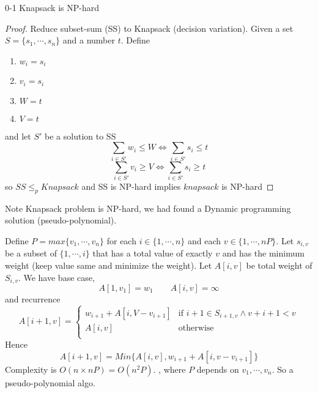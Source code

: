 \documentclass[11pt]{article}
\begin{document}
\begin{theorem*}
    0-1 Knapsack is NP-hard
    \begin{proof}
        Reduce subset-sum (SS) to Knapsack (decision variation). Given a set $S = \{s_1,\cdots, s_n \}$ and a number $t$. Define 
        \begin{enumerate}
            \item $w_i = s_i$
            \item $v_i = s_i$
            \item $W = t$
            \item $V = t$
        \end{enumerate}
        and let $S'$ be a solution to SS
        \[
            \sum_{i\in S'} w_i \leq W \iff \sum_{i\in S'} s_i \leq t
        \]
        \[
            \sum_{i\in S'} v_i \geq V \iff \sum_{i\in S'} s_i \geq t
        \]
        so $SS \leq_p Knapsack$ and SS is NP-hard implies $knapsack$ is NP-hard
    \end{proof}    
\end{theorem*}


\begin{defn*}
    Note Knapsack problem is NP-hard, we had found a Dynamic programming solution (pseudo-polynomial). \begin{solution}
        Define $P = max \{v_1,\cdots, v_n\}$ for each $i\in \{ 1,\cdots, n\}$ and each $v\in \{1,\cdots, nP \}$. Let $s_{i,v}$ be a subset of $\{ 1,\cdots, i\}$ that has a total value of exactly $v$ and has the minimum weight (keep value same and minimize the weight). Let $A[i, v] $ be total weight of $S_{i,v}$. We have base case, 
        \[
            A[1, v_1] = w_1 \quad \quad A[i,v] = \infty
        \]
        and recurrence 
        \[
            A[i+1,v] = 
            \begin{cases}
                 w_{i+1} + A[i, V - v_{i+1}] & \text{if } i+1 \in S_{i+1, v} \land v+{i+1} < v \\
                 A[i,v] & \text{otherwise} \\ 
            \end{cases}
        \]
        Hence 
        \[
            A[i+1, v] = Min\{A[i,v], w_{i+1} + A[i, v-v_{i+1}] \} 
        \]
        Complexity is $O(n \times nP) = O(n^2 P)$. , where $P$ depends on $v_1, \cdots, v_n$. So a pseudo-polynomial algo. 
    \end{solution}
\end{defn*}


\begin{algorithm}[H]

\end{algorithm}
\end{document}
